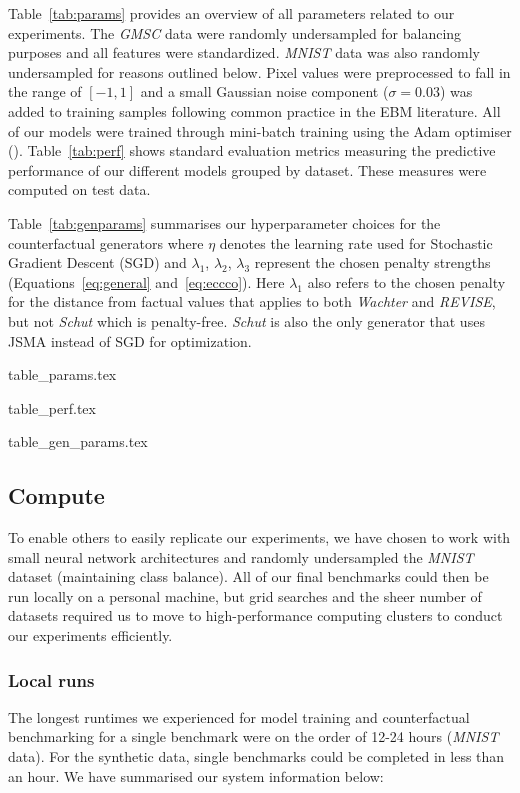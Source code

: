 Table~\ref{tab:params} provides an overview of all parameters related to our experiments. The \textit{GMSC} data were randomly undersampled for balancing purposes and all features were standardized. \textit{MNIST} data was also randomly undersampled for reasons outlined below. Pixel values were preprocessed to fall in the range of $[-1,1]$ and a small Gaussian noise component ($\sigma=0.03$) was added to training samples following common practice in the EBM literature. All of our models were trained through mini-batch training using the Adam optimiser (\citet{kingma2014adam}). Table~\ref{tab:perf} shows standard evaluation metrics measuring the predictive performance of our different models grouped by dataset. These measures were computed on test data. 

Table~\ref{tab:genparams} summarises our hyperparameter choices for the counterfactual generators where $\eta$ denotes the learning rate used for Stochastic Gradient Descent (SGD) and $\lambda_1$, $\lambda_2$, $\lambda_3$ represent the chosen penalty strengths (Equations~\ref{eq:general} and~\ref{eq:eccco}). Here $\lambda_1$ also refers to the chosen penalty for the distance from factual values that applies to both \textit{Wachter} and \textit{REVISE}, but not \textit{Schut} which is penalty-free. \textit{Schut} is also the only generator that uses JSMA instead of SGD for optimization.

{table_params.tex}

{table_perf.tex}

{table_gen_params.tex}

\subsection{Compute}

To enable others to easily replicate our experiments, we have chosen to work with small neural network architectures and randomly undersampled the \textit{MNIST} dataset (maintaining class balance). All of our final benchmarks could then be run locally on a personal machine, but grid searches and the sheer number of datasets required us to move to high-performance computing clusters to conduct our experiments efficiently. 

\subsubsection{Local runs}

The longest runtimes we experienced for model training and counterfactual benchmarking for a single benchmark were on the order of 12-24 hours (\textit{MNIST} data). For the synthetic data, single benchmarks could be completed in less than an hour. We have summarised our system information below:

